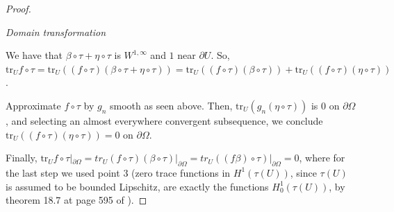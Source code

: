 \documentclass[english,a4paper,9pt,oneside]{scrbook}	%
\theoremstyle{break}
\newenvironment{mproof}[1][\proofname]{%
  \begin{proof}[#1]$ $\par\nobreak\ignorespaces
}{%
  \end{proof}
}
\renewcommand*{\proofname}{Proof}
\theoremstyle{remark}
\newcommand{\tr}{\text{tr}}
\begin{document}
\begin{appendices}
\begin{mproof}
%

\textit{Domain transformation}


We have that $\beta \circ \tau +  \eta \circ \tau$ is $W^{1,\infty}$ and $1$ near $\partial U$. 
So, $\tr_U f\circ \tau = \tr_U ((f\circ \tau)(\beta \circ \tau +  \eta \circ \tau) )= \tr_U ((f\circ \tau)(\beta \circ \tau)) + \tr_U ((f\circ \tau )( \eta \circ \tau))$.

Approximate $f\circ \tau$ by $g_n$ smooth as seen above.  Then, $\tr_U (g_n( \eta \circ \tau))$ is $0$ on $\partial \Omega$ , and  selecting an almost everywhere convergent subsequence, we conclude $\tr_U ((f\circ \tau)( \eta \circ \tau)) = 0$ on $\partial \Omega$. 

Finally, $\tr_U f\circ \tau|_{\partial \Omega} = tr_U (f\circ \tau)(\beta \circ \tau)|_{\partial \Omega} =  tr_U ((f\beta) \circ \tau)|_{\partial \Omega}= 0$, where for the last step we used point $3$ (zero trace functions in $H^1(\tau(U))$, since $\tau(U)$ is assumed to be bounded Lipschitz, are exactly the functions $H^1_0(\tau(U))$, by theorem 18.7 at page 595 of \cite{leoni}).
\end{mproof}


\end{appendices}
\end{document}
